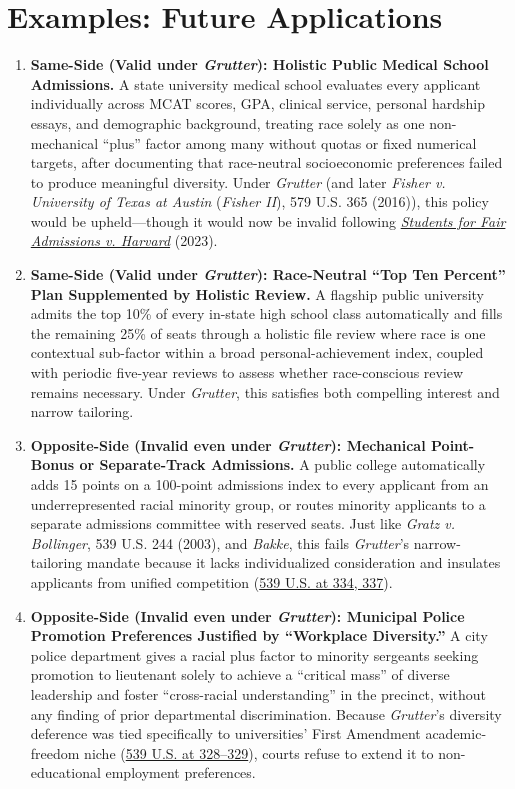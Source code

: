 \documentclass[12pt]{article}
\begin{document}
\section{Examples: Future Applications}
\begin{enumerate}
    \item \textbf{Same-Side (Valid under \textit{Grutter}): Holistic Public Medical School Admissions.} A state university medical school evaluates every applicant individually across MCAT scores, GPA, clinical service, personal hardship essays, and demographic background, treating race solely as one non-mechanical ``plus'' factor among many without quotas or fixed numerical targets, after documenting that race-neutral socioeconomic preferences failed to produce meaningful diversity. Under \textit{Grutter} (and later \textit{Fisher v. University of Texas at Austin} (\textit{Fisher II}), 579 U.S. 365 (2016)), this policy would be upheld---though it would now be invalid following \href{https://supreme.justia.com/cases/federal/us/600/20-1199/}{\textit{Students for Fair Admissions v. Harvard}} (2023).
    \item \textbf{Same-Side (Valid under \textit{Grutter}): Race-Neutral ``Top Ten Percent'' Plan Supplemented by Holistic Review.} A flagship public university admits the top 10\% of every in-state high school class automatically and fills the remaining 25\% of seats through a holistic file review where race is one contextual sub-factor within a broad personal-achievement index, coupled with periodic five-year reviews to assess whether race-conscious review remains necessary. Under \textit{Grutter}, this satisfies both compelling interest and narrow tailoring.
    \item \textbf{Opposite-Side (Invalid even under \textit{Grutter}): Mechanical Point-Bonus or Separate-Track Admissions.} A public college automatically adds 15 points on a 100-point admissions index to every applicant from an underrepresented racial minority group, or routes minority applicants to a separate admissions committee with reserved seats. Just like \textit{Gratz v. Bollinger}, 539 U.S. 244 (2003), and \textit{Bakke}, this fails \textit{Grutter}'s narrow-tailoring mandate because it lacks individualized consideration and insulates applicants from unified competition (\href{https://supreme.justia.com/cases/federal/us/539/306/}{539 U.S. at 334, 337}).
    \item \textbf{Opposite-Side (Invalid even under \textit{Grutter}): Municipal Police Promotion Preferences Justified by ``Workplace Diversity.''} A city police department gives a racial plus factor to minority sergeants seeking promotion to lieutenant solely to achieve a ``critical mass'' of diverse leadership and foster ``cross-racial understanding'' in the precinct, without any finding of prior departmental discrimination. Because \textit{Grutter}'s diversity deference was tied specifically to universities' First Amendment academic-freedom niche (\href{https://supreme.justia.com/cases/federal/us/539/306/}{539 U.S. at 328--329}), courts refuse to extend it to non-educational employment preferences.

\end{enumerate}
\end{document}
